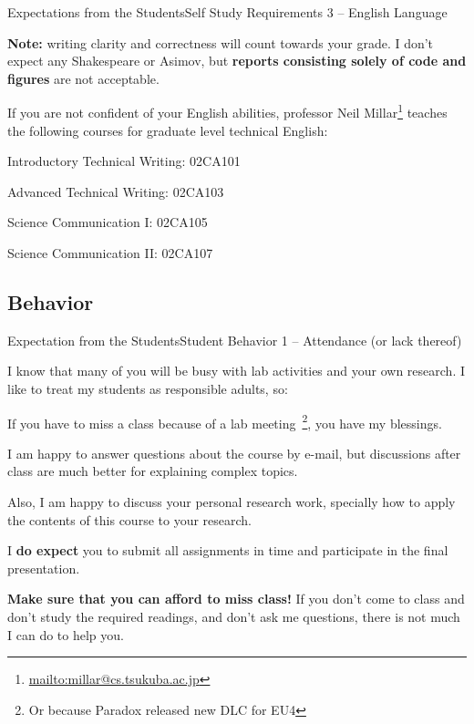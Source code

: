 \documentclass[t]{beamer}
\begin{document}
\begin{ftst}
  {Expectations from the Students}{Self Study Requirements 3 -- English Language}

  {\bf Note:} writing clarity and correctness will count towards your
  grade. I don't expect any Shakespeare or Asimov, but {\bf reports
    consisting solely of code and figures} are not acceptable.

  \vone
  
  If you are not confident of your English abilities, professor Neil
  Millar\footnote{\url{mailto:millar@cs.tsukuba.ac.jp}} teaches the
  following courses for graduate level technical English:
  
  \vone
  
  \bitems Introductory Technical Writing: 02CA101
\item Advanced Technical Writing: 02CA103
\item Science Communication I: 02CA105
\item Science Communication II: 02CA107
  \eitem

  
\end{ftst}

\subsection{Behavior}

\begin{ftst}
  {Expectation from the Students}{Student Behavior 1 -- Attendance (or lack thereof)}

  I know that many of you will be busy with lab activities and your
  own research. I like to treat my students as responsible adults, so:

  {\small

   If you have to
  miss a class because of a lab meeting~\footnote{Or because Paradox
    released new DLC for EU4}, you have my blessings.
\item I am happy to answer questions about the course by e-mail, but
  discussions after class are much better for explaining complex
  topics.
\item Also, I am happy to discuss your personal research work,
  specially how to apply the contents of this course to your research.
\item I {\bf do expect} you to submit all assignments in time and
  participate in the final presentation.\eitem }
  
{\bf Make sure that you can afford to miss class!} If you don't come
to class and don't study the required readings, and don't ask me
questions, there is not much I can do to help you.

\end{ftst}
\end{document}
